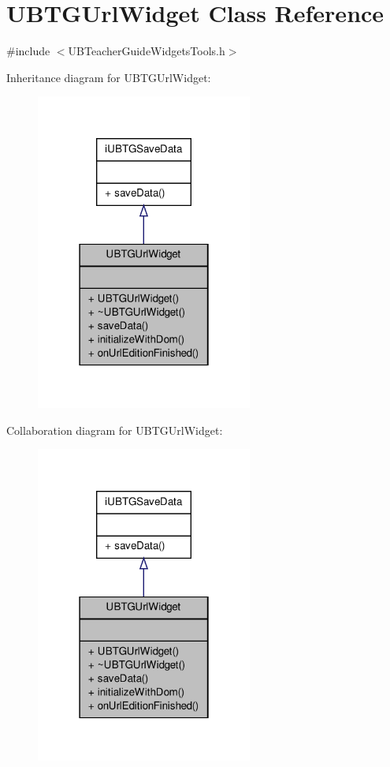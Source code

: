 \hypertarget{class_u_b_t_g_url_widget}{\section{U\-B\-T\-G\-Url\-Widget Class Reference}
\label{d7/dc9/class_u_b_t_g_url_widget}
}


{\ttfamily \#include $<$U\-B\-Teacher\-Guide\-Widgets\-Tools.\-h$>$}



Inheritance diagram for U\-B\-T\-G\-Url\-Widget\-:
\nopagebreak
\begin{figure}[H]
\begin{center}
\leavevmode
\includegraphics[width=202pt]{da/d85/class_u_b_t_g_url_widget__inherit__graph}
\end{center}
\end{figure}


Collaboration diagram for U\-B\-T\-G\-Url\-Widget\-:
\nopagebreak
\begin{figure}[H]
\begin{center}
\leavevmode
\includegraphics[width=202pt]{dc/df1/class_u_b_t_g_url_widget__coll__graph}
\end{center}
\end{figure}
